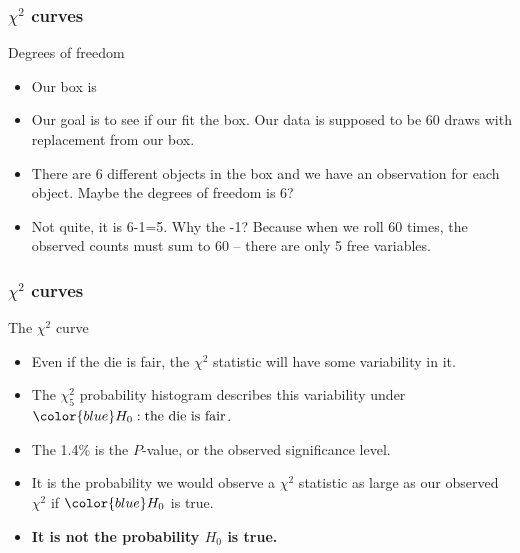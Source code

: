 \documentclass[handout]{beamer}
\begin{document}
   \begin{frame} \frametitle{$\chi^2$ curves}

   \begin{block}
   {Degrees of freedom}

   \begin{itemize}
   \item Our box is
     \begin{quote}
     \end{quote}
   \item Our goal is to see if our  fit the box. Our data is supposed to be
   60 draws with replacement from our box.

   \item There are 6 different objects in the box and we have an observation
   for each object. Maybe the degrees of
   freedom is 6?

   \item Not quite, it is 6-1=5. Why the -1? Because when we roll
   60 times, the observed counts must sum to 60 -- there are only 5 free
   variables.
   \end{itemize}
   \end{block}
   \end{frame}


   \begin{frame} \frametitle{$\chi^2$ curves}

   \begin{block}
   {The $\chi^2$ curve}

   \begin{itemize}
   \item Even if the die is fair, the $\chi^2$ statistic
   will have some variability in it.

   \item The $\chi^2_5$ probability histogram describes this variability
   under ${\color{blue} H_0: \text{the die is fair}}$.

   \item The 1.4\% is the {\color{orange} $P$-value}, or the observed significance level.

   \item It is the probability we would observe a $\chi^2$ statistic as large as our observed {\color{orange} $\chi^2$} if ${\color{blue} H_0}$ is true.


   \item {\bf \color{red} It is not the probability $H_0$ is true.}

   \end{itemize}
   \end{block}
   \end{frame}
\end{document}
